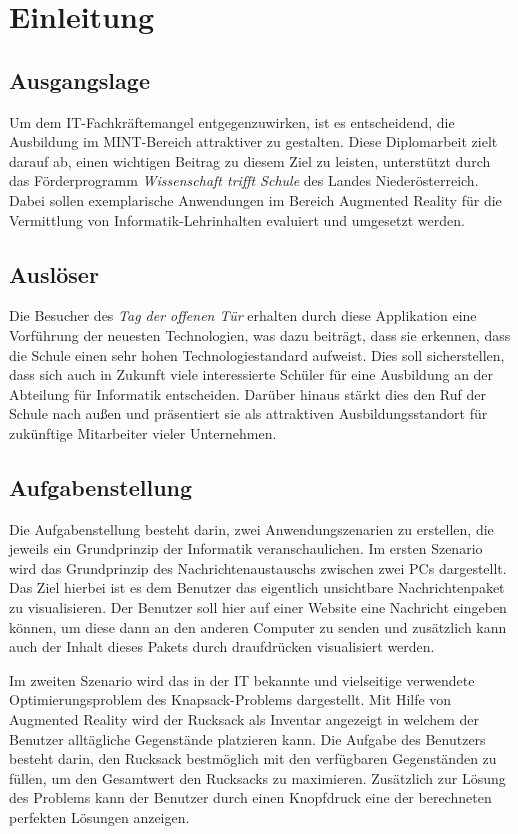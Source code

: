 \chapter{Einleitung}
\label{cha:Einleitung}

\section{Ausgangslage}
Um dem IT-Fachkräftemangel entgegenzuwirken, ist es entscheidend, die Ausbildung im MINT-Bereich attraktiver zu gestalten.
Diese Diplomarbeit zielt darauf ab, einen wichtigen Beitrag zu diesem Ziel zu leisten, unterstützt durch das Förderprogramm
\textit{Wissenschaft trifft Schule} des Landes Niederösterreich. Dabei sollen exemplarische Anwendungen im Bereich Augmented
Reality für die Vermittlung von Informatik-Lehrinhalten evaluiert und umgesetzt werden.

\section{Auslöser}
Die Besucher des \textit{Tag der offenen Tür} erhalten durch diese Applikation eine Vorführung der neuesten Technologien,
was dazu beiträgt, dass sie erkennen, dass die Schule einen sehr hohen Technologiestandard aufweist. Dies soll sicherstellen,
dass sich auch in Zukunft viele interessierte Schüler für eine Ausbildung an der Abteilung für Informatik entscheiden. Darüber
hinaus stärkt dies den Ruf der Schule nach außen und präsentiert sie als attraktiven Ausbildungsstandort für zukünftige Mitarbeiter
vieler Unternehmen.

\section{Aufgabenstellung}
Die Aufgabenstellung besteht darin, zwei Anwendungszenarien zu erstellen, die jeweils ein Grundprinzip der Informatik
veranschaulichen. Im ersten Szenario wird das Grundprinzip des Nachrichtenaustauschs zwischen zwei PCs dargestellt. Das Ziel
hierbei ist es dem Benutzer das eigentlich unsichtbare Nachrichtenpaket zu visualisieren. Der Benutzer soll hier auf einer
Website eine Nachricht eingeben können, um diese dann an den anderen Computer zu senden und zusätzlich kann auch der Inhalt
dieses Pakets durch draufdrücken visualisiert werden.

Im zweiten Szenario wird das in der IT bekannte und vielseitige verwendete Optimierungsproblem des Knapsack-Problems dargestellt.
Mit Hilfe von Augmented Reality wird der Rucksack als Inventar angezeigt in welchem der Benutzer alltägliche Gegenstände
platzieren kann. Die Aufgabe des Benutzers besteht darin, den Rucksack bestmöglich mit den verfügbaren Gegenständen
zu füllen, um den Gesamtwert den Rucksacks zu maximieren. Zusätzlich zur Lösung des Problems kann der Benutzer durch
einen Knopfdruck eine der berechneten perfekten Lösungen anzeigen.

